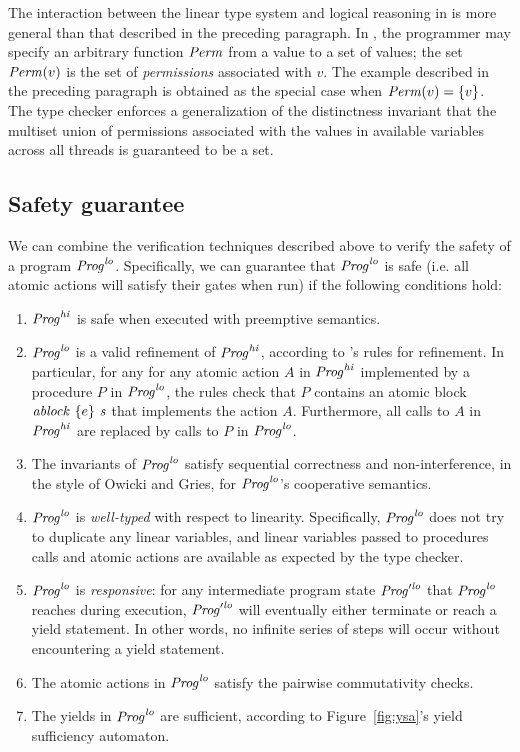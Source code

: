 The interaction between the linear type system and logical reasoning in \civl is more general than that described in the preceding paragraph.
In \civl, the programmer may specify an arbitrary function $\mathit{Perm}$ from a value to a set of values;
the set $\mathit{Perm}(v)$ is the set of {\em permissions\/} associated with $v$.
The example described in the preceding paragraph is obtained as the special case when $\mathit{Perm}(v) = \{v\}$.
The \civl type checker enforces a generalization of the distinctness invariant that 
the multiset union of permissions associated with the values in available variables across all threads is guaranteed to be a set.

\subsection{Safety guarantee}

We can combine the verification techniques described above to verify the safety of a program $\mathit{Prog}^{\mathit{lo}}$.
Specifically, we can guarantee that $\mathit{Prog}^{\mathit{lo}}$ is safe (i.e. all atomic actions will satisfy their gates when run)
if the following conditions hold:

\begin{enumerate}
\item
$\mathit{Prog}^{\mathit{hi}}$ is safe when executed with preemptive semantics.
\item
$\mathit{Prog}^{\mathit{lo}}$ is a valid refinement of $\mathit{Prog}^{\mathit{hi}}$, according to \civl's rules for refinement.
In particular, for any for any atomic action $A$ in $\mathit{Prog}^{\mathit{hi}}$ implemented by a procedure $P$ in $\mathit{Prog}^{\mathit{lo}}$,
the rules check that $P$ contains an atomic block $\mathit{ablock}\ {\{e\}}\ {\mathit{s}}$ that implements the action $A$.
Furthermore, all calls to $A$ in $\mathit{Prog}^{\mathit{hi}}$ are replaced by calls to $P$ in $\mathit{Prog}^{\mathit{lo}}$.
\item
The invariants of $\mathit{Prog}^{\mathit{lo}}$ satisfy sequential correctness and non-interference,
in the style of Owicki and Gries,
for $\mathit{Prog}^{\mathit{lo}}$'s cooperative semantics.
\item
$\mathit{Prog}^{\mathit{lo}}$ is {\em well-typed} with respect to linearity.
Specifically, $\mathit{Prog}^{\mathit{lo}}$ does not try to duplicate any linear variables,
and linear variables passed to procedures calls and atomic actions are available
as expected by the type checker.
\item
$\mathit{Prog}^{\mathit{lo}}$ is {\em responsive}:
for any intermediate program state $\mathit{Prog}'^{\mathit{lo}}$ that $\mathit{Prog}^{\mathit{lo}}$ reaches during execution,
$\mathit{Prog}'^{\mathit{lo}}$ will eventually either terminate or reach a yield statement.
In other words, no infinite series of steps will occur without encountering a yield statement.
\item
The atomic actions in $\mathit{Prog}^{\mathit{lo}}$ satisfy the pairwise commutativity checks.
\item
The yields in $\mathit{Prog}^{\mathit{lo}}$ are sufficient, according to Figure~\ref{fig:ysa}'s yield sufficiency automaton.
\end{enumerate}

